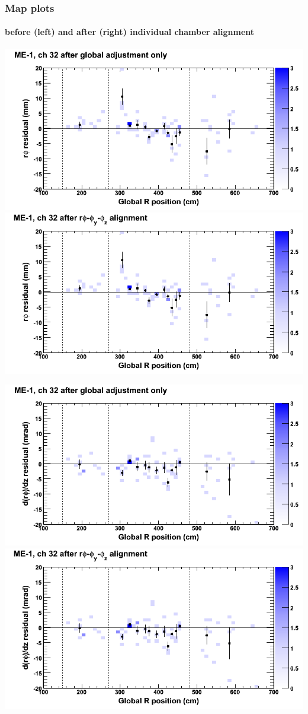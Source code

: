 \documentclass[compress]{beamer}
\begin{document}
\begin{frame}
\frametitle{Map plots}
\framesubtitle{before (left) and after (right) individual chamber alignment}
\includegraphics[width=0.5\linewidth]{ringmapplots_3dof/before_CSCvsr_mem1ch32_x.png} \includegraphics[width=0.5\linewidth]{ringmapplots_3dof/after_CSCvsr_mem1ch32_x.png}

\includegraphics[width=0.5\linewidth]{ringmapplots_3dof/before_CSCvsr_mem1ch32_dxdz.png} \includegraphics[width=0.5\linewidth]{ringmapplots_3dof/after_CSCvsr_mem1ch32_dxdz.png}
\end{frame}
\end{document}
